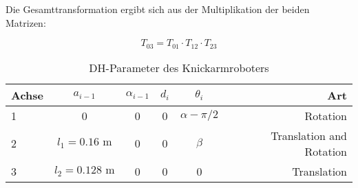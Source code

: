 Die Gesamttransformation ergibt sich aus der Multiplikation der beiden Matrizen:

\begin{equation*}
	T_{03} = T_{01} \cdot T_{12} \cdot T_{23}
\end{equation*}

\begin{table}[tb]
	\centering
	\begin{tabular}{lccccr}
		\toprule
		Achse & $a_{i-1}$ & $\alpha_{i-1}$ & $d_i$ & $\theta_i$ & Art \\
		\midrule
		1 & 0& 0& 0& $\alpha - \pi/2$& Rotation \\
		2 & $l_1 = 0.16 \text{ m}$& 0& 0& $\beta$& Translation and Rotation\\
		3 & $l_2 = 0.128 \text{ m}$& 0& 0& 0& Translation\\ 
		\bottomrule
	\end{tabular}
	\caption{DH-Parameter des Knickarmroboters}
	\label{tab:DH}
\end{table}
